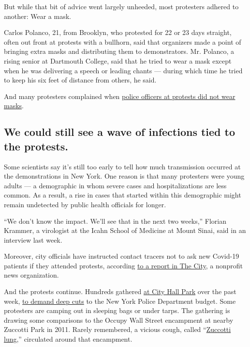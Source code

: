 But while that bit of advice went largely unheeded, most protesters
adhered to another: Wear a mask.

Carlos Polanco, 21, from Brooklyn, who protested for 22 or 23 days
straight, often out front at protests with a bullhorn, said that
organizers made a point of bringing extra masks and distributing them to
demonstrators. Mr. Polanco, a rising senior at Dartmouth College, said
that he tried to wear a mask except when he was delivering a speech or
leading chants --- during which time he tried to keep his six feet of
distance from others, he said.

And many protesters complained when
\href{https://www.nytimes3xbfgragh.onion/2020/06/11/nyregion/nypd-face-masks-nyc-protests.html}{police
officers at protests did not wear masks}.

\hypertarget{we-could-still-see-a-wave-of-infections-tied-to-the-protests}{%
\subsection{We could still see a wave of infections tied to the
protests.}\label{we-could-still-see-a-wave-of-infections-tied-to-the-protests}}

Some scientists say it's still too early to tell how much transmission
occurred at the demonstrations in New York. One reason is that many
protesters were young adults --- a demographic in whom severe cases and
hospitalizations are less common. As a result, a rise in cases that
started within this demographic might remain undetected by public health
officials for longer.

``We don't know the impact. We'll see that in the next two weeks,''
Florian Krammer, a virologist at the Icahn School of Medicine at Mount
Sinai, said in an interview last week.

Moreover, city officials have instructed contact tracers not to ask new
Covid-19 patients if they attended protests, according
\href{https://www.thecity.nyc/coronavirus/2020/6/14/21290963/nyc-covid-19-trackers-skipping-floyd-protest-questions-even-amid-fears-of-new-wave}{to
a report in The City}, a nonprofit news organization.

And the protests continue. Hundreds gathered
\href{https://www.nytimes3xbfgragh.onion/2020/07/22/nyregion/occupy-city-hall-protest-nypd.html}{at
City Hall Park} over the past week,
\href{https://www.nytimes3xbfgragh.onion/2020/06/28/nyregion/occupy-city-hall-nyc.html}{to
demand deep cuts} to the New York Police Department budget. Some
protesters are camping out in sleeping bags or under tarps. The
gathering is drawing some comparisons to the Occupy Wall Street
encampment at nearby Zuccotti Park in 2011. Rarely remembered, a vicious
cough, called
``\href{https://www.nytimes3xbfgragh.onion/2020/06/28/nyregion/occupy-city-hall-nyc.html}{Zuccotti
lung},'' circulated around that encampment.

